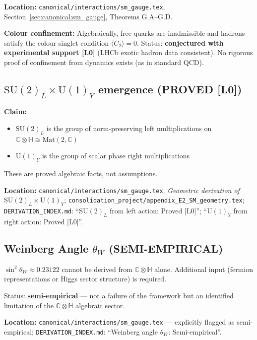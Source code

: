 \textbf{Location:} \texttt{canonical/interactions/sm\_gauge.tex},
Section~\ref{sec:canonical:sm_gauge}, Theorems G.A--G.D.

\textbf{Colour confinement:} Algebraically, free quarks are inadmissible and
hadrons satisfy the colour singlet condition $\langle C_2\rangle = 0$.
Status: \textbf{conjectured with experimental support [L0]} (LHCb exotic hadron
data consistent). No rigorous proof of confinement from dynamics exists (as in
standard QCD).

\subsection{\texorpdfstring{$\mathrm{SU}(2)_L \times \mathrm{U}(1)_Y$}{SU(2)\_L x U(1)\_Y} emergence (PROVED [L0])}

\textbf{Claim:}
\begin{itemize}
  \item $\mathrm{SU}(2)_L$ is the group of norm-preserving left multiplications
        on $\mathbb{C}\otimes\mathbb{H} \cong \mathrm{Mat}(2,\mathbb{C})$
  \item $\mathrm{U}(1)_Y$ is the group of scalar phase right multiplications
\end{itemize}

These are proved algebraic facts, not assumptions.

\textbf{Location:} \texttt{canonical/interactions/sm\_gauge.tex},
\emph{Geometric derivation of $\mathrm{SU}(2)_L \times \mathrm{U}(1)_Y$};
\texttt{consolidation\_project/appendix\_E2\_SM\_geometry.tex};
\texttt{DERIVATION\_INDEX.md}: ``$\mathrm{SU}(2)_L$ from left action: Proved [L0]'';
``$\mathrm{U}(1)_Y$ from right action: Proved [L0]''.

\subsection{Weinberg Angle \texorpdfstring{$\theta_W$}{theta\_W} (SEMI-EMPIRICAL)}

\begin{tcolorbox}[colback=orange!10!white,colframe=orange!75!black,title=Semi-empirical: $\theta_W$]
$\sin^2\theta_W \approx 0.23122$ cannot be derived from $\mathbb{C}\otimes\mathbb{H}$
alone. Additional input (fermion representations or Higgs sector structure) is required.

Status: \textbf{semi-empirical} — not a failure of the framework but an identified
limitation of the $\mathbb{C}\otimes\mathbb{H}$ algebraic sector.

\textbf{Location:} \texttt{canonical/interactions/sm\_gauge.tex} — explicitly
flagged as semi-empirical; \texttt{DERIVATION\_INDEX.md}: ``Weinberg angle
$\theta_W$: Semi-empirical''.
\end{tcolorbox}

